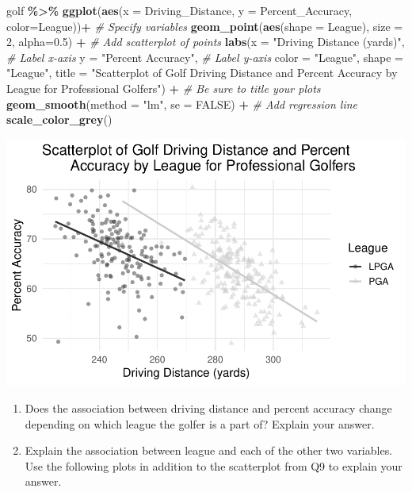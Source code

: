 \documentclass[
]{report}
\newenvironment{Shaded}{\begin{snugshade}}{\end{snugshade}}
\newcommand{\AttributeTok}[1]{\textcolor[rgb]{0.13,0.29,0.53}{#1}}
\newcommand{\CommentTok}[1]{\textcolor[rgb]{0.56,0.35,0.01}{\textit{#1}}}
\newcommand{\ConstantTok}[1]{\textcolor[rgb]{0.56,0.35,0.01}{#1}}
\newcommand{\DecValTok}[1]{\textcolor[rgb]{0.00,0.00,0.81}{#1}}
\newcommand{\FloatTok}[1]{\textcolor[rgb]{0.00,0.00,0.81}{#1}}
\newcommand{\FunctionTok}[1]{\textcolor[rgb]{0.13,0.29,0.53}{\textbf{#1}}}
\newcommand{\NormalTok}[1]{#1}
\newcommand{\SpecialCharTok}[1]{\textcolor[rgb]{0.81,0.36,0.00}{\textbf{#1}}}
\newcommand{\StringTok}[1]{\textcolor[rgb]{0.31,0.60,0.02}{#1}}
\begin{document}
\begin{Shaded}
\begin{Highlighting}[]
\NormalTok{golf }\SpecialCharTok{\%\textgreater{}\%}
  \FunctionTok{ggplot}\NormalTok{(}\FunctionTok{aes}\NormalTok{(}\AttributeTok{x =}\NormalTok{ Driving\_Distance, }\AttributeTok{y =}\NormalTok{ Percent\_Accuracy, }\AttributeTok{color=}\NormalTok{League))}\SpecialCharTok{+}  \CommentTok{\# Specify variables}
  \FunctionTok{geom\_point}\NormalTok{(}\FunctionTok{aes}\NormalTok{(}\AttributeTok{shape =}\NormalTok{ League), }\AttributeTok{size =} \DecValTok{2}\NormalTok{, }\AttributeTok{alpha=}\FloatTok{0.5}\NormalTok{) }\SpecialCharTok{+}  \CommentTok{\# Add scatterplot of points}
  \FunctionTok{labs}\NormalTok{(}\AttributeTok{x =} \StringTok{"Driving Distance (yards)"}\NormalTok{,  }\CommentTok{\# Label x{-}axis}
       \AttributeTok{y =} \StringTok{"Percent Accuracy"}\NormalTok{,  }\CommentTok{\# Label y{-}axis}
       \AttributeTok{color =} \StringTok{"League"}\NormalTok{, }\AttributeTok{shape =} \StringTok{"League"}\NormalTok{,}
       \AttributeTok{title =} \StringTok{"Scatterplot of Golf Driving Distance and Percent }
\StringTok{       Accuracy by League for Professional Golfers"}\NormalTok{) }\SpecialCharTok{+} \CommentTok{\# Be sure to title your plots}
  \FunctionTok{geom\_smooth}\NormalTok{(}\AttributeTok{method =} \StringTok{"lm"}\NormalTok{, }\AttributeTok{se =} \ConstantTok{FALSE}\NormalTok{) }\SpecialCharTok{+} \CommentTok{\# Add regression line}
    \FunctionTok{scale\_color\_grey}\NormalTok{()}
\end{Highlighting}
\end{Shaded}

\begin{center}\includegraphics[width=0.6\linewidth]{13-A29-regression-theory_files/figure-latex/unnamed-chunk-6-1} \end{center}

\begin{enumerate}
\def\labelenumi{\arabic{enumi}.}
\setcounter{enumi}{10}
\item
  Does the association between driving distance and percent accuracy change depending on which league the golfer is a part of? Explain your answer.\\
  \vspace{1in}
\item
  Explain the association between league and each of the other two variables. Use the following plots in addition to the scatterplot from Q9 to explain your answer.
\end{enumerate}
\end{document}
